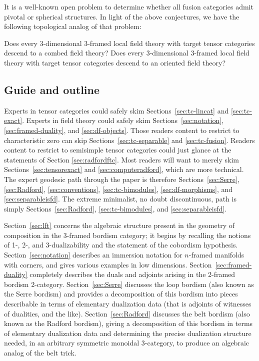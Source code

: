 \documentclass{amsart}
\begin{document}
It is a well-known open problem to determine whether all fusion categories admit pivotal or spherical structures.  In light of the above conjectures, we have the following topological analog of that problem:
\begin{mainquestion}
Does every 3-dimensional 3-framed local field theory with target tensor categories descend to a combed field theory?  Does every 3-dimensional 3-framed local field theory with target tensor categories descend to an oriented field theory?
\end{mainquestion}

\subsection{Guide and outline}

Experts in tensor categories could safely skim Sections~\ref{sec:tc-lincat} and \ref{sec:tc-exact}.  Experts in field theory could safely skim Sections~\ref{sec:notation}, \ref{sec:framed-duality}, and \ref{sec:df-objects}.  Those readers content to restrict to characteristic zero can skip Sections~\ref{sec:tc-separable} and \ref{sec:tc-fusion}.  Readers content to restrict to semisimple tensor categories could just glance at the statements of Section \ref{sec:radfordftc}.  Most readers will want to merely skim Sections~\ref{sec:tensorexact} and \ref{sec:computeradford}, which are more technical.  The expert geodesic path through the paper is therefore Sections~\ref{sec:Serre}, \ref{sec:Radford}, \ref{sec:conventions}, \ref{sec:tc-bimodules}, \ref{sec:df-morphisms}, and \ref{sec:separableisfd}.  The extreme minimalist, no doubt discontinuous, path is simply Sections~\ref{sec:Radford}, \ref{sec:tc-bimodules}, and \ref{sec:separableisfd}.

Section~\ref{sec:lft} concerns the algebraic structure present in the geometry of composition in the 3-framed bordism category; it begins by recalling the notions of 1-, 2-, and 3-dualizability and the statement of the cobordism hypothesis.  Section~\ref{sec:notation} describes an immersion notation for $n$-framed manifolds with corners, and gives various examples in low dimensions.  Section~\ref{sec:framed-duality} completely describes the duals and adjoints arising in the 2-framed bordism 2-category.  Section~\ref{sec:Serre} discusses the loop bordism (also known as the Serre bordism) and provides a decomposition of this bordism into pieces describable in terms of elementary dualization data (that is adjoints of witnesses of dualities, and the like).  Section~\ref{sec:Radford} discusses the belt bordism (also known as the Radford bordism), giving a decomposition of this bordism in terms of elementary dualization data and determining the precise dualization structure needed, in an arbitrary symmetric monoidal 3-category, to produce an algebraic analog of the belt trick.
\end{document}
